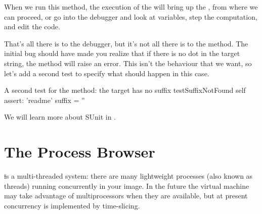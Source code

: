 \documentclass[a4paper,10pt,twoside]{book}
\begin{document}
When we run this method, the execution of the  will bring up the , from where we can proceed, or go into the debugger and look at variables, step the computation, and edit the code.

That's all there is to the debugger, but it's not all there is to the  method.  
The initial bug should have made you realize that if there is no dot in the target string, the  method will raise an error.  
This isn't the behaviour that we want, so let's add a second test to specify what should happen in this case.

\begin{method}[testNoSuffix]{A second test for the  method: the target has no suffix}
testSuffixNotFound
	self assert: 'readme' suffix = ''
\end{method}


We will learn more about SUnit in .


\section{The Process Browser}

\st is a multi-threaded system: there are many lightweight processes (also known as threads) running concurrently in your image. 
In the future the \pharo virtual machine may take advantage of multiprocessors when they are available, but at present concurrency is implemented by time-slicing.
\end{document}
